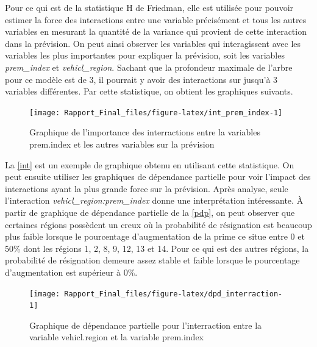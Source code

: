 \documentclass[]{article}
\begin{document}
\newpage

Pour ce qui est de la statistique H de Friedman, elle est utilisée pour
pouvoir estimer la force des interactions entre une variable précisément
et tous les autres variables en mesurant la quantité de la variance qui
provient de cette interaction dans la prévision. On peut ainsi observer
les variables qui interagissent avec les variables les plus importantes
pour expliquer la prévision, soit les variables \emph{prem\_index} et
\emph{vehicl\_region}. Sachant que la profondeur maximale de l'arbre
pour ce modèle est de 3, il pourrait y avoir des interactions sur
jusqu'à 3 variables différentes. Par cette statistique, on obtient les
graphiques suivants.

\begin{figure}

{\centering \texttt{[image: Rapport\_Final\_files/figure-latex/int\_prem\_index-1]} 

}

\caption{\label{int}Graphique de l'importance des interractions entre la variables prem.index et les autres variables sur la prévision}\label{fig:int_prem_index}
\end{figure}

La \autoref{int} est un exemple de graphique obtenu en utilisant cette
statistique. On peut ensuite utiliser les graphiques de dépendance
partielle pour voir l'impact des interactions ayant la plus grande force
sur la prévision. Après analyse, seule l'interaction
\emph{vehicl\_region:prem\_index} donne une interprétation intéressante.
À partir de graphique de dépendance partielle de la \autoref{pdp}, on
peut observer que certaines régions possèdent un creux où la probabilité
de résignation est beaucoup plus faible lorsque le pourcentage
d'augmentation de la prime ce situe entre 0 et 50\% dont les régions 1,
2, 8, 9, 12, 13 et 14. Pour ce qui est des autres régions, la
probabilité de résignation demeure assez stable et faible lorsque le
pourcentage d'augmentation est supérieur à 0\%.

\begin{figure}

{\centering \texttt{[image: Rapport\_Final\_files/figure-latex/dpd\_interraction-1]} 

}

\caption{\label{pdp}Graphique de dépendance partielle pour l'interraction entre la variable vehicl.region et la variable prem.index}\label{fig:dpd_interraction}
\end{figure}
\end{document}
